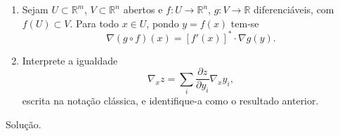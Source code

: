 \begin{homeworkProblem}[Seção 2-8]
  \begin{enumerate}
        \item[(a)] Sejam $U \subset \mathbb{R}^m$, $V \subset \mathbb{R}^n$ abertos e $f : U \to \mathbb{R}^n$, $g : V \to \mathbb{R}$ diferenciáveis, com $f(U) \subset V$. Para todo $x \in U$, pondo $y = f(x)$ tem-se
        \[
        \nabla (g \circ f)(x) = [f'(x)]^* \cdot \nabla g(y).
        \]

        \item[(b)] Interprete a igualdade
        \[
        \nabla_x z = \sum_i \frac{\partial z}{\partial y_i} \nabla_x y_i,
        \]
        escrita na notação clássica, e identifique-a como o resultado anterior.
    \end{enumerate}
  \begin{solution}
    Solução.
  \end{solution}
\end{homeworkProblem}
